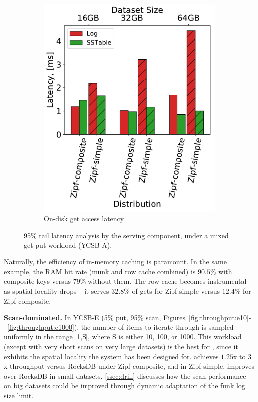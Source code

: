 \begin{figure}[htb]
\begin{subfigure}{0.49\linewidth}
\includegraphics[width=\textwidth]{figs/Latency_A.pdf}
\caption{On-disk get access latency}
\label{fig:readstat:lat}
\end{subfigure}
\caption{{\sys\/ 95\% tail latency analysis by the serving component, under a mixed get-put workload (YCSB-A).}}
\label{fig:readstat}
\end{figure}

Naturally, the efficiency of in-memory caching is paramount. In the same example, the RAM hit rate 
(munk and row cache combined) is 
$90.5\%$ with composite keys versus $79\%$ without them. The row cache becomes instrumental as spatial locality drops --
 it serves $32.8\%$ of gets for Zipf-simple versus $12.4\%$ for Zipf-composite. 

{\bf Scan-dominated.} In YCSB-E (5\% put, 95\% scan, Figures~\ref{fig:throughput:e10}-~\ref{fig:throughput:e1000}).
the number of items to iterate through is  
sampled uniformly in the range [1,S], where S is either 10, 100, or 1000. 
This workload (except with very short scans on very large datasets) is the best for \sys, since it exhibits the spatial locality the system has been designed for. 
\sys\/ achieves $1.25$x to $3$x throughput versus RocksDB under Zipf-composite, and in Zipf-simple, improves over RocksDB in small datasets. 
\cref{ssec:drill} discusses how the scan performance on big datasets could be improved through dynamic adaptation of the 
funk log size limit.
 
